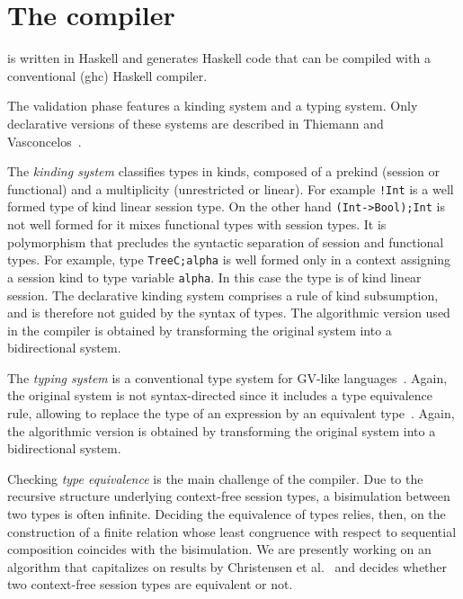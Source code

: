 \section{The compiler}
\label{sec:compiler}

\freest{} is written in Haskell and generates Haskell code that can be
compiled with a conventional (ghc) Haskell compiler.

The validation phase features a kinding system and a typing
system. Only declarative versions of these systems are described in
Thiemann and Vasconcelos~\cite{DBLP:conf/icfp/ThiemannV16}.

The \emph{kinding system} classifies types in kinds, composed of a
prekind (session or functional) and a multiplicity (unrestricted or
linear). For example \lstinline|!Int| is a well formed type of kind
linear session type. On the other hand \lstinline|(Int->Bool);Int| is
not well formed for it mixes functional types with session types.
%
It is polymorphism that precludes the syntactic separation of session
and functional types. For example, type \lstinline|TreeC;alpha| is
well formed only in a context assigning a session kind to type
variable \lstinline|alpha|. In this case the type is of kind linear
session.
%
The declarative kinding system comprises a rule of kind subsumption,
and is therefore not guided by the syntax of types. The algorithmic
version used in the compiler is obtained by transforming the original
system into a bidirectional system.

The \emph{typing system} is a conventional type system for GV-like
languages~\cite{DBLP:journals/jfp/GayV10}. Again, the original system
is not syntax-directed since it includes a type equivalence rule,
allowing to replace the type of an expression by an equivalent
type~\cite{DBLP:conf/icfp/ThiemannV16}. Again, the algorithmic version
is obtained by transforming the original system into a bidirectional
system.

Checking \emph{type equivalence} is the main challenge of the
compiler. Due to the recursive structure underlying context-free 
session types, a bisimulation between two types is often infinite. 
Deciding the equivalence of types relies, then, on the construction 
of a finite relation whose least congruence with respect to  
sequential composition coincides with the bisimulation. We are 
presently working on an algorithm that capitalizes on results by 
Christensen et al.~\cite{DBLP:journals/iandc/ChristensenHS95} and 
decides whether two context-free session types are equivalent or not.  

